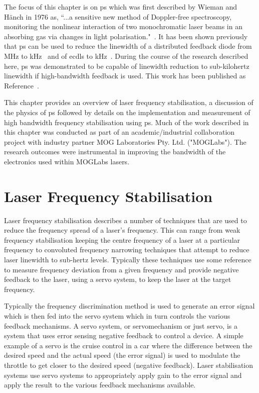 The focus of this chapter is on \gls{ps} which was first described by Wieman and H\"anch in 1976 as, ``...a sensitive new method of Doppler-free spectroscopy, monitoring the nonlinear interaction of two monochromatic laser beams in an absorbing gas via changes in light polarisation."~\cite{wieman_doppler-free_1976,demtroder_laser_2003}.
It has been shown previously that \gls{ps} can be used to reduce the linewidth of a distributed feedback diode from \unit[2]{MHz} to \unit[20]{kHz}~\cite{torii_laser-phase_2012} and of \glspl{ecdl} to \unit[65]{kHz}~\cite{yoshikawa_frequency_2003}.
During the course of the research described here, \gls{ps} was demonstrated to be capable of linewidth reduction to sub-kilohertz linewidth if high-bandwidth feedback is used.
This work has been published as Reference~\cite{torrance_sub-kilohertz_2016}.

This chapter provides an overview of laser frequency stabilisation, a discussion of the physics of \gls{ps} followed by details on the implementation and measurement of high bandwidth frequency stabilisation using \gls{ps}.
Much of the work described in this chapter was conducted as part of an academic/industrial collaboration project with industry partner MOG Laboratories Pty. Ltd. ("MOGLabs").
The research outcomes were instrumental in improving the bandwidth of the electronics used within MOGLabs lasers.

\section{Laser Frequency Stabilisation}

Laser frequency stabilisation describes a number of techniques that are used to reduce the frequency spread of a laser's frequency.
This can range from weak frequency stabilisation keeping the centre frequency of a laser at a particular frequency to convoluted frequency narrowing techniques that attempt to reduce laser linewidth to sub-hertz levels.
Typically these techniques use some reference to measure frequency deviation from a given frequency and provide negative feedback to the laser, using a servo system, to keep the laser at the target frequency.

Typically the frequency discrimination method is used to generate an error signal which is then fed into the servo system which in turn controls the various feedback mechanisms.
A servo system, or servomechanism or just servo, is a system that uses error sensing negative feedback to control a device.
A simple example of a servo is the cruise control in a car where the difference between the desired speed and the actual speed (the error signal) is used to modulate the throttle to get closer to the desired speed (negative feedback).
Laser stabilisation systems use servo systems to appropriately apply gain to the error signal and apply the result to the various feedback mechanisms available.


